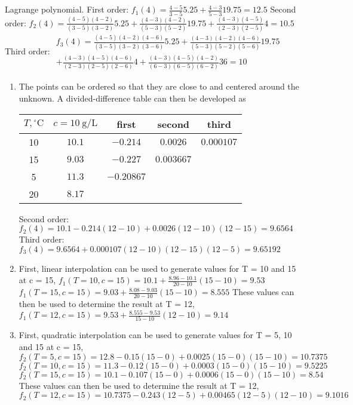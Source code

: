\documentclass[../main.tex]{subfiles}
\begin{document}
\section{}
Lagrange polynomial.
	\bigbreak
First order:
	\bigbreak
$f_{1}(4)=\frac{4-5}{3-5} 5.25+\frac{4-3}{5-3} 19.75=12.5$
	\bigbreak
Second order:
	\bigbreak
$f_{2}(4)=\frac{(4-5)(4-2)}{(3-5)(3-2)} 5.25+\frac{(4-3)(4-2)}{(5-3)(5-2)} 19.75+\frac{(4-3)(4-5)}{(2-3)(2-5)} 4=10.5$
	\bigbreak
Third order:
	\bigbreak
$
\begin{aligned}
f_{3}(4)=\frac{(4-5)(4-2)(4-6)}{(3-5)(3-2)(3-6)} 5.25+\frac{(4-3)(4-2)(4-6)}{(5-3)(5-2)(5-6)} 19.75 \\
+ \frac{(4-3)(4-5)(4-6)}{(2-3)(2-5)(2-6)} 4+\frac{(4-3)(4-5)(4-2)}{(6-3)(6-5)(6-2)} 36=10
\end{aligned}
$
\begin{enumerate}[label=\bfseries(\alph*)]
\item The points can be ordered so that they are close to and centered around the unknown. A
divided-difference table can then be developed as
	\bigbreak 
\begin{tabular}{ccccc}
\hline
$T,{ }^{\circ} \mathrm{C}$ & $c=10 \mathrm{~g} / \mathrm{L}$ & first & second & third \\
\hline
10 & $10.1$ & $-0.214$ & $0.0026$ & $0.000107$ \\
15 & $9.03$ & $-0.227$ & $0.003667$ &  \\
5 & $11.3$ & $-0.20867$ &  &  \\
20 & $8.17$ &  &  &  \\
\hline
\end{tabular}
	\bigbreak
Second order:
	\bigbreak
$f_{2}(4)=10.1-0.214(12-10)+0.0026(12-10)(12-15)=9.6564$
	\bigbreak
Third order:
	\bigbreak
$f_{3}(4)=9.6564+0.000107(12-10)(12-15)(12-5)=9.65192$
	\bigbreak
\item First, linear interpolation can be used to generate values for T = 10 and 15 at c = 15,
	\bigbreak
$f_{1}(T=10, c=15)=10.1+\frac{8.96-10.1}{20-10}(15-10)=9.53$
	\bigbreak
$f_{1}(T=15, c=15)=9.03+\frac{8.08-9.03}{20-10}(15-10)=8.555$
	\bigbreak
These values can then be used to determine the result at T = 12,
	\bigbreak
$f_{1}(T=12, c=15)=9.53+\frac{8.555-9.53}{15-10}(12-10)=9.14$
	\bigbreak
\item First, quadratic interpolation can be used to generate values for T = 5, 10 and 15 at c = 15,
	\bigbreak
$f_{2}(T=5, c=15)=12.8-0.15(15-0)+0.0025(15-0)(15-10)=10.7375$
	\bigbreak
$f_{2}(T=10, c=15)=11.3-0.12(15-0)+0.0003(15-0)(15-10)=9.5225$
	\bigbreak
$f_{2}(T=15, c=15)=10.1-0.107(15-0)+0.0006(15-0)(15-10)=8.54$
	\bigbreak
These values can then be used to determine the result at T = 12,
	\bigbreak
$f_{2}(T=12, c=15)=10.7375-0.243(12-5)+0.00465(12-5)(12-10)=9.1016$
\end{enumerate}
	\bigbreak
\end{document}
